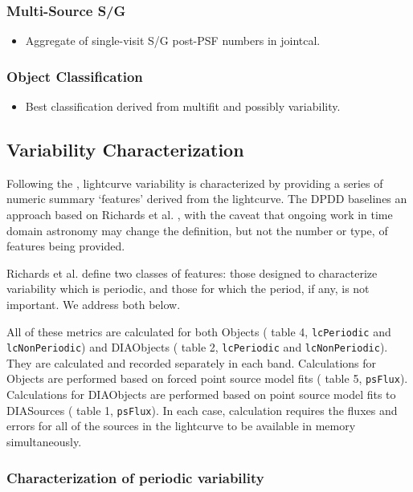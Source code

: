 \subsubsection{Multi-Source S/G}
\label{sec:acJointCalClassification}
\begin{itemize}
\item Aggregate of single-visit S/G post-PSF numbers in jointcal.
\end{itemize}
\subsubsection{Object Classification}
\label{sec:acObjectClassification}
\begin{itemize}
\item Best classification derived from multifit and possibly variability.
\end{itemize}

\subsection{Variability Characterization}
\label{sec:acVariabilityCharacterization}

Following the \DPDD{}, lightcurve variability is characterized by providing a series of numeric summary `features' derived from the lightcurve. The DPDD baselines an approach based on Richards et al. \cite{Richards11}, with the caveat that ongoing work in time domain astronomy may change the definition, but not the number or type, of features being provided.

Richards et al. define two classes of features: those designed to characterize variability which is periodic, and those for which the period, if any, is not important. We address both below.

All of these metrics are calculated for both Objects (\DPDD{} table 4, \texttt{lcPeriodic} and \texttt{lcNonPeriodic}) and DIAObjects (\DPDD{} table 2, \texttt{lcPeriodic} and \texttt{lcNonPeriodic}). They are calculated and recorded separately in each band. Calculations for Objects are performed based on forced point source model fits (\DPDD{} table 5, \texttt{psFlux}).  Calculations for DIAObjects are performed based on point source model fits to DIASources (\DPDD{} table 1, \texttt{psFlux}). In each case, calculation requires the fluxes and errors for all of the sources in the lightcurve to be available in memory simultaneously.

\subsubsection{Characterization of periodic variability}

